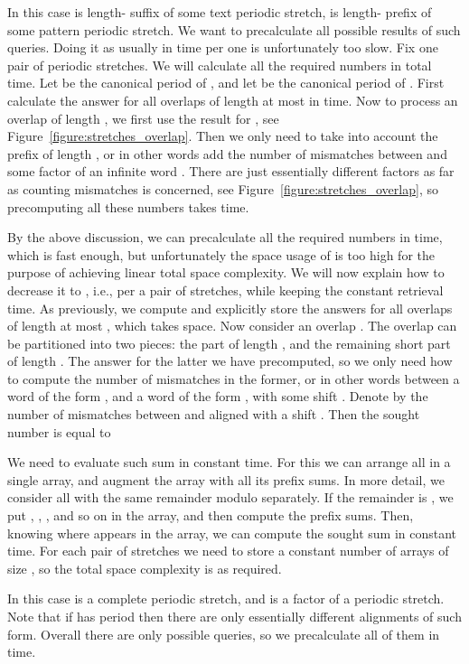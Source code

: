 \documentclass[runningheads]{llncs}
\begin{document}
\begin{mycases}[listparindent=15pt]
\item In this case  is length- suffix of some text periodic stretch,  is length- prefix of some pattern periodic stretch. We want to precalculate all possible  results of such queries. Doing it as usually in  time per one is unfortunately too slow. Fix one pair of periodic stretches. We will calculate all the  required numbers in  total time. Let  be the canonical period of ,  and let  be the canonical period of . First calculate the answer for all overlaps of length at most  in  time. Now to process an overlap of length , we first use the result for , see Figure~\ref{figure:stretches_overlap}. Then we only need to take into account the prefix of length , or in other words add the number of mismatches between  and some factor of an infinite word . There are just  essentially different factors as far as counting mismatches is concerned, see Figure~\ref{figure:stretches_overlap}, so precomputing all these  numbers takes  time.

By the above discussion, we can precalculate all the required numbers in  time, which is fast enough, but unfortunately the space usage of  is 
too high for the purpose of achieving linear total space complexity. We will now explain how to decrease it to , i.e.,  per a pair of stretches,
while keeping the constant retrieval time. As previously, we compute and explicitly store the answers for all overlaps of length at most , which takes  space.
Now consider an overlap . The overlap can be partitioned into two pieces: the part of length
, and the remaining short part of length . The answer for the latter we have precomputed, so we only need how to compute the number of 
mismatches in the former, or in other words between a word of the form , and a word of the form , with some shift .
Denote by  the number of mismatches between  and  aligned with a shift . Then the sought number
is equal to

We need to evaluate such sum in constant time. For this we can arrange all  in a single array, and augment the array with all its prefix sums.
In more detail, we consider all  with the same remainder modulo  separately. If the remainder is , we put , ,
, and so on in the array, and then compute the prefix sums. Then, knowing where  appears in the array, we can compute the
sought sum in constant time. For each pair of stretches we need to store a constant number of arrays of size , so the total space complexity is as required.

\item In this case  is a complete periodic stretch, and  is a factor of a periodic stretch. Note that if  has period  then there are only  essentially different alignments of such form. Overall there are only  possible queries, so we precalculate all of them in  time.
\end{mycases}
\end{document}
